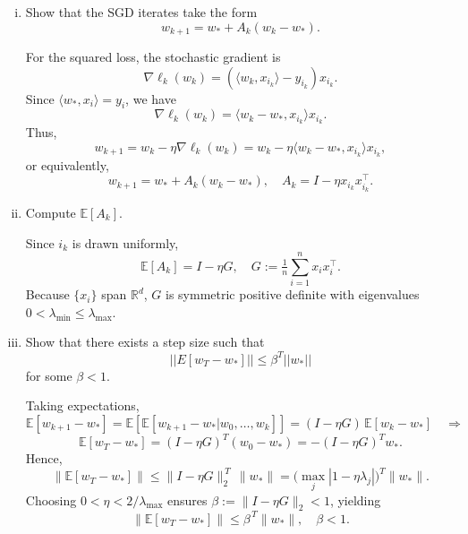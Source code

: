 \documentclass[a4paper]{article}
\begin{document}
\begin{enumerate}[(i)]
    \item Show that the SGD iterates take the form
        $$w_{k+1} = w_* + A_k (w_k - w_* ).$$

For the squared loss, the stochastic gradient is
\[
\nabla \ell_k(w_k) = (\langle w_k, x_{i_k}\rangle - y_{i_k})x_{i_k}.
\]
Since $\langle w_*, x_i\rangle = y_i$, we have
\[
\nabla \ell_k(w_k) = \langle w_k - w_*, x_{i_k}\rangle x_{i_k}.
\]
Thus,
\[
w_{k+1} = w_k - \eta \nabla \ell_k(w_k)
= w_k - \eta \langle w_k - w_*, x_{i_k}\rangle x_{i_k},
\]
or equivalently,
\[
\boxed{w_{k+1} = w_* + A_k (w_k - w_*), \quad A_k = I - \eta x_{i_k}x_{i_k}^\top.}
\]

    \item Compute $\mathbb{E}[A_k]$.

Since $i_k$ is drawn uniformly,
\[
    \boxed{\mathbb{E}[A_k] = I - \eta G, \quad G := \tfrac{1}{n}\sum_{i=1}^n x_i x_i^\top.}
\]
Because $\{x_i\}$ span $\mathbb{R}^d$, $G$ is symmetric positive definite with eigenvalues 
$0<\lambda_{\min}\le\lambda_{\max}$.

    \item Show that there exists a step size such that
        $$|| E[w_T - w_* ]|| \leq \beta^T ||w_*||$$
for some $\beta < 1$.

Taking expectations,
$$\mathbb{E}[w_{k+1}-w_*] 
= \mathbb{E}[\mathbb{E}[w_{k+1}-w_*|w_0, \dots, w_k]]
= (I - \eta G)\,\mathbb{E}[w_k-w_*]
\quad\Rightarrow$$
$$\mathbb{E}[w_T-w_*] = (I - \eta G)^T (w_0 - w_*) = -(I - \eta G)^T w_*.$$
Hence,
\[
\|\mathbb{E}[w_T - w_*]\|
\le \|I - \eta G\|_2^{\,T}\,\|w_*\|
= \big(\max_j |1 - \eta \lambda_j|\big)^{\!T}\|w_*\|.
\]
Choosing $0 < \eta < 2/\lambda_{\max}$ ensures $\beta := \|I - \eta G\|_2 < 1$, yielding
\[
\boxed{\;\|\mathbb{E}[w_T - w_*]\| \le \beta^{\,T}\|w_*\|,\quad \beta < 1.\;}
\]

\end{enumerate}
\end{document}
